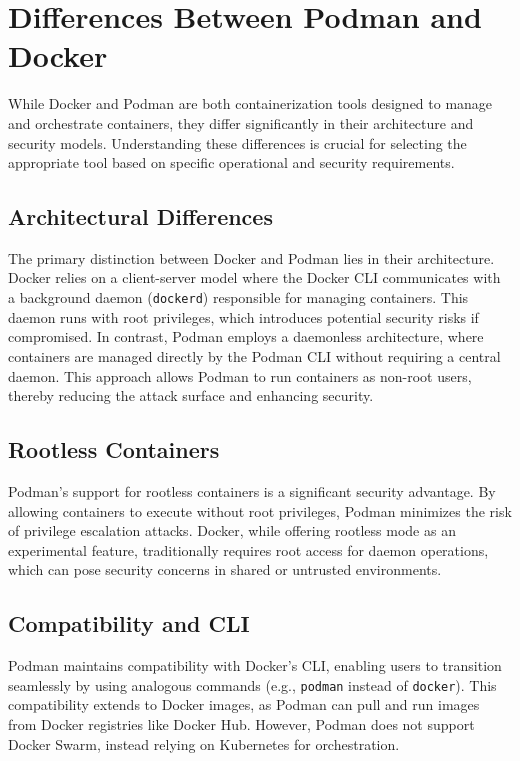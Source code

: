 \documentclass[12pt,a4paper]{report}
\begin{document}
\section{Differences Between Podman and Docker}

While Docker and Podman are both containerization tools designed to manage and orchestrate containers, they differ significantly in their architecture and security models. Understanding these differences is crucial for selecting the appropriate tool based on specific operational and security requirements.

\subsection{Architectural Differences}
The primary distinction between Docker and Podman lies in their architecture. Docker relies on a client-server model where the Docker CLI communicates with a background daemon (\texttt{dockerd}) responsible for managing containers. This daemon runs with root privileges, which introduces potential security risks if compromised. In contrast, Podman employs a daemonless architecture, where containers are managed directly by the Podman CLI without requiring a central daemon. This approach allows Podman to run containers as non-root users, thereby reducing the attack surface and enhancing security.

\subsection{Rootless Containers}
Podman's support for rootless containers is a significant security advantage. By allowing containers to execute without root privileges, Podman minimizes the risk of privilege escalation attacks. Docker, while offering rootless mode as an experimental feature, traditionally requires root access for daemon operations, which can pose security concerns in shared or untrusted environments.

\subsection{Compatibility and CLI}
Podman maintains compatibility with Docker's CLI, enabling users to transition seamlessly by using analogous commands (e.g., \texttt{podman} instead of \texttt{docker}). This compatibility extends to Docker images, as Podman can pull and run images from Docker registries like Docker Hub. However, Podman does not support Docker Swarm, instead relying on Kubernetes for orchestration.
\end{document}
